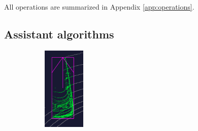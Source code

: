 \documentclass[letterpaper, 10 pt, conference]{ieeeconf}  %
\begin{document}
All operations are summarized in Appendix \ref{app:operations}.



\subsection{Assistant algorithms}
\begin{figure}[t]
	\centering

	\begin{subfigure}[t]{0.2\linewidth}
		\includegraphics[height=4cm]{./figures/points-enclosed}
		\caption{}


\end{subfigure}
\end{figure}
\end{document}
